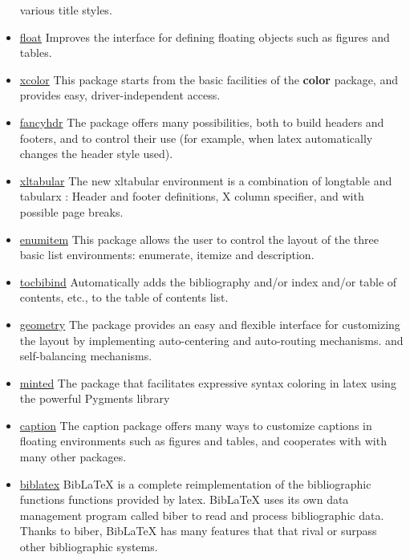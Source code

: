 \begin{itemize}
          various title styles.
    \item \href{https://www.ctan.org/pkg/float}{float} Improves the interface for defining floating objects
          such as figures and tables.
    \item \href{https://www.ctan.org/pkg/xcolor}{xcolor} This package starts from the basic facilities
          of the \textbf{color} package, and provides easy, driver-independent access.
    \item \href{https://www.ctan.org/pkg/fancyhdr}{fancyhdr} The package offers many possibilities,
          both to build headers and footers, and to control their use (for example, when \gls{latex} automatically changes the header style used).
    \item \href{https://www.ctan.org/pkg/xltabular}{xltabular} The new xltabular environment is a combination
          of longtable and tabularx : Header and footer definitions, X column specifier,
          and with possible page breaks.
    \item \href{https://www.ctan.org/pkg/enumitem}{enumitem} This package allows the user to control
          the layout of the three basic list environments: enumerate, itemize and description.
    \item \href{https://www.ctan.org/pkg/tocbibind}{tocbibind} Automatically adds the bibliography and/or
          index and/or table of contents, etc., to the table of contents list.
    \item \href{https://www.ctan.org/pkg/geometry}{geometry} The package provides an easy and flexible
          interface for customizing the layout by implementing auto-centering and auto-routing mechanisms.
          and self-balancing mechanisms.
    \item \href{https://www.ctan.org/pkg/minted}{minted} The package that facilitates expressive syntax coloring in
          \gls{latex} using the powerful Pygments library
    \item \href{https://www.ctan.org/pkg/caption}{caption} The caption package offers many ways to customize captions
          in floating environments such as figures and tables, and cooperates with with many other packages.
    \item \href{https://www.ctan.org/pkg/biblatex}{biblatex} BibLaTeX is a complete reimplementation of the bibliographic functions
          functions provided by \gls{latex}. BibLaTeX uses its own data management program called biber
          to read and process bibliographic data. Thanks to biber, BibLaTeX has many features that
          that rival or surpass other bibliographic systems.
\end{itemize}

